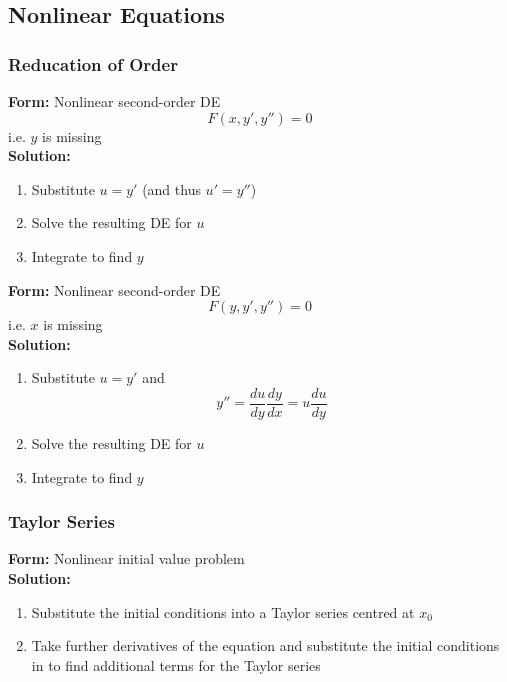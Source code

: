 \documentclass{article}
\begin{document}
\subsection{Nonlinear Equations}

\subsubsection{Reducation of Order}

\textbf{Form:} Nonlinear second-order DE \[F(x, y', y'') = 0\] i.e. $y$ is missing \\ \textbf{Solution:} \begin{enumerate}
  \item Substitute $u = y'$ (and thus $u' = y''$)

  \item Solve the resulting DE for $u$

  \item Integrate to find $y$
\end{enumerate} \textbf{Form:} Nonlinear second-order DE \[F(y, y', y'') = 0\] i.e. $x$ is missing \\ \textbf{Solution:} \begin{enumerate}
  \item Substitute $u = y'$ and \[y'' = \frac{du}{dy} \frac{dy}{dx} = u \frac{du}{dy}\]

  \item Solve the resulting DE for $u$

  \item Integrate to find $y$
\end{enumerate}

\subsubsection{Taylor Series}

\textbf{Form:} Nonlinear initial value problem \\ \textbf{Solution:} \begin{enumerate}
  \item Substitute the initial conditions into a Taylor series centred at $x_0$

  \item Take further derivatives of the equation and substitute the initial conditions in to find additional terms for the Taylor series
\end{enumerate}
\end{document}

